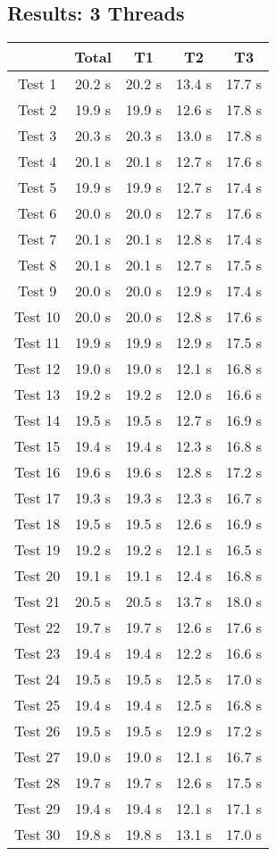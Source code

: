 \documentclass[12pt]{article}
\begin{document}
\subsection{Results: 3 Threads}
\begin{tabular}{ | c | c | c | c | c | }
  \hline	 & Total & T1 & T2 & T3 \\ \hline 
  Test 1& 20.2 s& 20.2 s& 13.4 s& 17.7 s\\ \hline 
  Test 2& 19.9 s& 19.9 s& 12.6 s& 17.8 s\\ \hline 
  Test 3& 20.3 s& 20.3 s& 13.0 s& 17.8 s\\ \hline 
  Test 4& 20.1 s& 20.1 s& 12.7 s& 17.6 s\\ \hline 
  Test 5& 19.9 s& 19.9 s& 12.7 s& 17.4 s\\ \hline 
  Test 6& 20.0 s& 20.0 s& 12.7 s& 17.6 s\\ \hline 
  Test 7& 20.1 s& 20.1 s& 12.8 s& 17.4 s\\ \hline 
  Test 8& 20.1 s& 20.1 s& 12.7 s& 17.5 s\\ \hline 
  Test 9& 20.0 s& 20.0 s& 12.9 s& 17.4 s\\ \hline 
  Test 10& 20.0 s& 20.0 s& 12.8 s& 17.6 s\\ \hline 
  Test 11& 19.9 s& 19.9 s& 12.9 s& 17.5 s\\ \hline 
  Test 12& 19.0 s& 19.0 s& 12.1 s& 16.8 s\\ \hline 
  Test 13& 19.2 s& 19.2 s& 12.0 s& 16.6 s\\ \hline 
  Test 14& 19.5 s& 19.5 s& 12.7 s& 16.9 s\\ \hline 
  Test 15& 19.4 s& 19.4 s& 12.3 s& 16.8 s\\ \hline 
  Test 16& 19.6 s& 19.6 s& 12.8 s& 17.2 s\\ \hline 
  Test 17& 19.3 s& 19.3 s& 12.3 s& 16.7 s\\ \hline 
  Test 18& 19.5 s& 19.5 s& 12.6 s& 16.9 s\\ \hline 
  Test 19& 19.2 s& 19.2 s& 12.1 s& 16.5 s\\ \hline 
  Test 20& 19.1 s& 19.1 s& 12.4 s& 16.8 s\\ \hline 
  Test 21& 20.5 s& 20.5 s& 13.7 s& 18.0 s\\ \hline 
  Test 22& 19.7 s& 19.7 s& 12.6 s& 17.6 s\\ \hline 
  Test 23& 19.4 s& 19.4 s& 12.2 s& 16.6 s\\ \hline 
  Test 24& 19.5 s& 19.5 s& 12.5 s& 17.0 s\\ \hline 
  Test 25& 19.4 s& 19.4 s& 12.5 s& 16.8 s\\ \hline 
  Test 26& 19.5 s& 19.5 s& 12.9 s& 17.2 s\\ \hline 
  Test 27& 19.0 s& 19.0 s& 12.1 s& 16.7 s\\ \hline 
  Test 28& 19.7 s& 19.7 s& 12.6 s& 17.5 s\\ \hline 
  Test 29& 19.4 s& 19.4 s& 12.1 s& 17.1 s\\ \hline 
  Test 30& 19.8 s& 19.8 s& 13.1 s& 17.0 s\\ \hline 
  \end{tabular}
  
\end{document}
